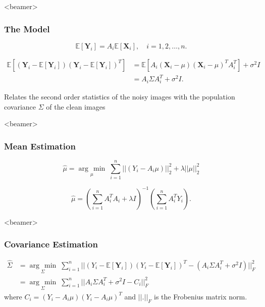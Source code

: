 \documentclass{beamer}
\newcommand{\argmin}[1]{\underset{#1}{\operatorname{arg}\,\operatorname{min}}\;}
\begin{document}
\begin{frame}<beamer>
\frametitle{The Model}
\begin{equation}
\mathbb{E}[\textbf{Y}_i]=A_i \mathbb{E}[\textbf{X}_i], \quad i=1,2,\ldots,n.
\label{eqn:exp_y}
\end{equation}

\begin{equation}
\begin{aligned}
\mathbb{E}[(\textbf{Y}_i-\mathbb{E}[\textbf{Y}_i])(\textbf{Y}_i-\mathbb{E}[\textbf{Y}_i])^T] 
&= \mathbb{E} [A_i(\textbf{X}_i-\mu)(\textbf{X}_i-\mu)^T A_i^T] + \sigma^2I \\
&=  A_i \Sigma A_i^T + \sigma^2I .
\end{aligned}
\label{eqn:expectation_eq}
\end{equation}

Relates the second order statistics of the noisy images with the 
population covariance $\Sigma$ of the clean images
\end{frame}



\begin{frame}<beamer>
\frametitle{Mean Estimation}

\begin{equation}
 \hat\mu = \argmin{\mu} \sum_{i=1}^n||(Y_i-A_i\mu)||_2^2 + \lambda||\mu||_2^2
\end{equation}

\begin{equation}
 \hat\mu = (\sum_{i=1}^n A_i^T A_i + \lambda I)^{-1}(\sum_{i=1}^n 
A_i^T Y_i).
\label{eq:ls_mean_sol}
\end{equation}
\end{frame}


\begin{frame}<beamer>
\frametitle{Covariance Estimation}
\begin{equation}
\begin{aligned}
\hat\Sigma 
&= \argmin{\Sigma} \sum_{i=1}^n || (Y_i - \mathbb{E}[\textbf{Y}_i]) (Y_i - \mathbb{E}[\textbf{Y}_i])^T
- (A_i \Sigma A_i^T + \sigma^2 I)||_F^2 \\
&= \argmin{\Sigma} \sum_{i=1}^n || A_i\Sigma A_i^T + \sigma^2 I - C_i  ||_F^2 
\end{aligned}
\label{eqn:ls1}
\end{equation}
where $C_i=(Y_i - A_i \mu) (Y_i - A_i \mu)^T$ and $||.||_F$ is the Frobenius matrix norm. 
\end{frame}
\end{document}
